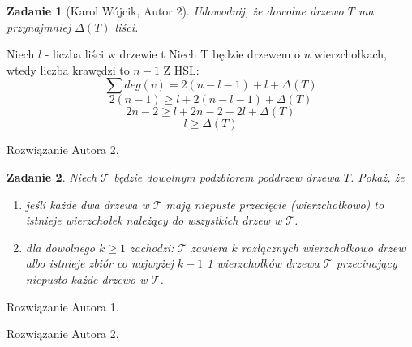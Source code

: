 \documentclass{mwart}
\newcommand{\T}{\mathcal{T}}
\newtheorem{zad}{Zadanie}[section]
\begin{document}
\begin{zad}[Karol Wójcik, Autor 2]
    Udowodnij, że dowolne drzewo $T$ ma przynajmniej $\Delta(T)$ liści.
\end{zad}
\begin{mdframed}
    Niech $l$ - liczba liści w drzewie t
    \newline\newline
    Niech T będzie drzewem o $n$ wierzchołkach, wtedy liczba krawędzi to $n-1$
    \newline\newline
    Z HSL:
    \[
    \sum deg(v) = 2(n-l-1) + l + \Delta(T)
    \]
    \[
    2(n-1) \geqslant l + 2(n-l-1) + \Delta(T)
    \]
    \[
    2n-2 \geqslant l + 2n - 2 -2l + \Delta(T)
    \]
    \[
    l \geqslant \Delta(T)
    \]
\end{mdframed}
\begin{mdframed}
    Rozwiązanie Autora 2.
\end{mdframed}

\begin{zad}
    Niech $\T$ będzie dowolnym podzbiorem poddrzew drzewa $T$. Pokaż, że
    \begin{enumerate}
        \item jeśli każde dwa drzewa w $\T$ mają niepuste przecięcie (wierzchołkowo) to istnieje
              wierzchołek należący do wszystkich drzew w $\T$.

        \item dla dowolnego $k \geq 1$ zachodzi: $\T$ zawiera $k$ rozłącznych wierzchołkowo drzew albo
              istnieje zbiór co najwyżej $k-1$ 1 wierzchołków drzewa $\T$ przecinający niepusto każde
              drzewo w $\T$.
    \end{enumerate}
\end{zad}
\begin{mdframed}
    Rozwiązanie Autora 1.
\end{mdframed}
\begin{mdframed}
    Rozwiązanie Autora 2.
\end{mdframed}
\end{document}
